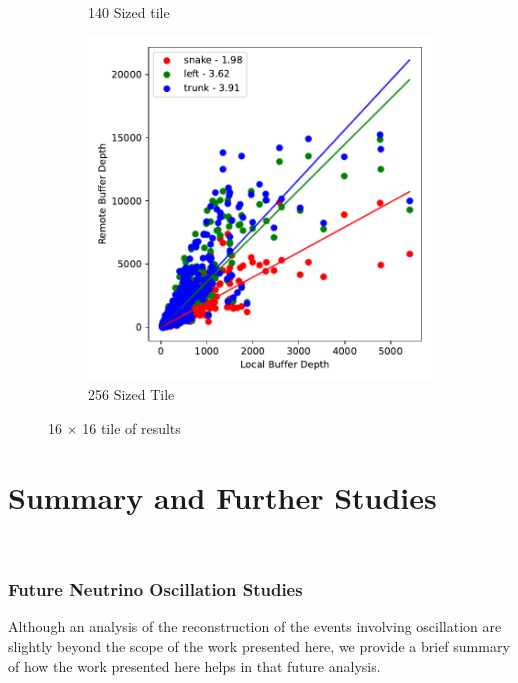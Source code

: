 \begin{figure}
\begin{subfigure}[b]{0.475\textwidth}
      \caption[]%
      {\small 140 Sized tile}    
  \end{subfigure}
  \hfill
  \begin{subfigure}[b]{0.475\textwidth}   
      \centering 
      \includegraphics[width=\textwidth]{./images/mp60_256_fast_route_fits.pdf}
      \caption[]%
      {\small 256 Sized Tile}    
  \end{subfigure}
  \caption[ Information on the 16 by 16 tile. ]
  {\small 16 $\times$ 16 tile of results} 
  \label{fig:compare_fast_plots_for_digital_sim_fast}
\end{figure}







\section{Summary and Further Studies}~\label{sec:further_studies}

\subsubsection{Future Neutrino Oscillation Studies}

Although an analysis of the reconstruction of the events involving oscillation are slightly beyond the scope of the work presented here, we provide a brief summary of how the work presented here helps in that future analysis.
